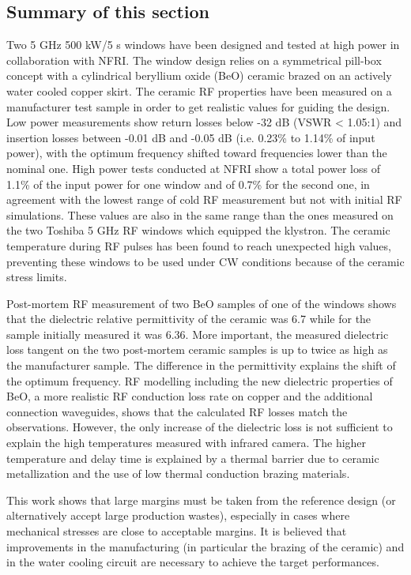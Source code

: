 \subsection{Summary of this section}
Two 5 GHz 500 kW/5 s windows have been designed and tested at high power in collaboration with NFRI. The window design relies on a symmetrical pill-box concept with a cylindrical beryllium oxide (BeO) ceramic brazed on an actively water cooled copper skirt. The ceramic RF properties have been measured on a manufacturer test sample in order to get realistic values for guiding the design. Low power measurements show return losses below -32 dB (VSWR < 1.05:1) and insertion losses between -0.01 dB and -0.05 dB (i.e. 0.23\% to 1.14\% of input power), with the optimum frequency shifted toward frequencies lower than the nominal one. High power tests conducted at NFRI show a total power loss of 1.1\% of the input power for one window and of 0.7\% for the second one, in agreement with the lowest range of cold RF measurement but not with initial RF simulations. These values are also in the same range than the ones measured on the two Toshiba 5 GHz RF windows which equipped the klystron. The ceramic temperature during RF pulses has been found to reach unexpected high values, preventing these windows to be used under CW conditions because of the ceramic stress limits. 

Post-mortem RF measurement of two BeO samples of one of the windows shows that the dielectric relative permittivity of the ceramic was 6.7 while for the sample initially measured it was 6.36. More important, the measured dielectric loss tangent on the two post-mortem ceramic samples is up to twice as high as the manufacturer sample. The difference in the permittivity explains the shift of the optimum frequency.  RF modelling including the new dielectric properties of BeO, a more realistic RF conduction loss rate on copper and the additional connection waveguides, shows that the calculated RF losses match the observations. However, the only increase of the dielectric loss is not sufficient to explain the high temperatures measured with infrared camera. The higher temperature and delay time is explained by a thermal barrier due to ceramic metallization and the use of low thermal conduction brazing materials. 

 
This work shows that large margins must be taken from the reference design (or alternatively accept large production wastes), especially in cases where mechanical stresses are close to acceptable margins. It is believed that improvements in the manufacturing (in particular the brazing of the ceramic) and in the water cooling circuit are necessary to achieve the target performances.  